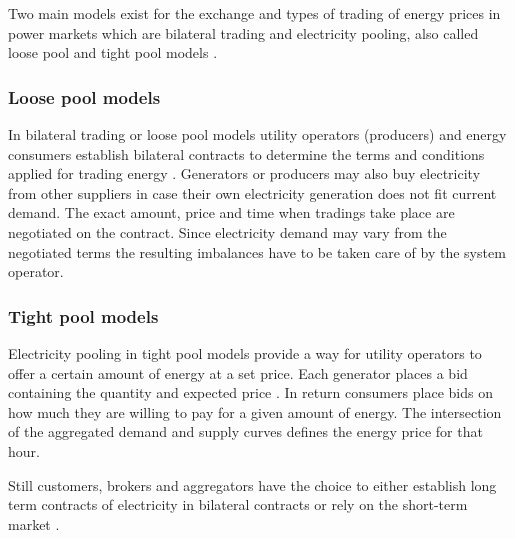 Two main models exist for the exchange and types of trading of energy prices in power markets which are bilateral trading and electricity pooling, also called loose pool and tight pool models \cite{onaiwu2009does,hogan1997reshaping,barroso2005classification,reston2012short}.

\subsubsection{Loose pool models}

In bilateral trading or loose pool models utility operators (producers) and energy consumers establish bilateral contracts to determine the terms and conditions applied for trading energy \cite{onaiwu2009does,kalverboer2001electricity}. Generators or producers may also buy electricity from other suppliers in case their own electricity generation does not fit current demand. The exact amount, price and time when tradings take place are negotiated on the contract. Since electricity demand may vary from the negotiated terms the resulting imbalances have to be taken care of by the system operator. 

\subsubsection{Tight pool models}

Electricity pooling in tight pool models provide a way for utility operators to offer a certain amount of energy at a set price. Each generator places a bid containing the quantity and expected price \cite{barroso2005classification}. In return consumers place bids on how much they are willing to pay for a given amount of energy. The intersection of the aggregated demand and supply curves defines the energy price for that hour. 

Still customers, brokers and aggregators have the choice to either establish long term contracts of electricity in bilateral contracts or rely on the short-term market \cite{hogan1997reshaping}.







